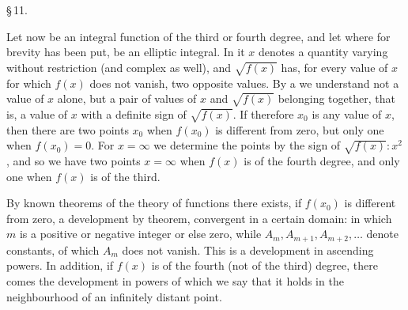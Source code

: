 \begin{center}
\S\,11. \textbf{}
\end{center}
Let now
be an integral function of the third or fourth degree, and let
where for brevity
has been put, be an elliptic integral. In it $x$ denotes a quantity varying without restriction (and complex as well), and $\sqrt{f(x)}$ has, for every value of $x$ for which $f(x)$ does not vanish, two opposite values. By a  we understand not a value of $x$ alone, but a pair of values of $x$ and $\sqrt{f(x)}$ belonging together, that is, a value of $x$ with a definite sign of $\sqrt{f(x)}$. If therefore $x_0$ is any value of $x$, then there are two points $x_0$ when $f(x_0)$ is different from zero, but only one when $f(x_0) = 0$. For $x = \infty$ we determine the points by the sign of $\sqrt{f(x)}:x^2$, and so we have two points $x = \infty$ when $f(x)$ is of the fourth degree, and only one when $f(x)$ is of the third.

By known theorems of the theory of functions there exists, if $f(x_0)$ is different from zero, a development by  theorem, convergent in a certain domain:
in which $m$ is a positive or negative integer or else zero, while $A_m, A_{m+1}, A_{m+2}, \dots$ denote constants, of which $A_m$ does not vanish. This is a development in ascending powers. In addition, if $f(x)$ is of the fourth (not of the third) degree, there comes the development in  powers
of which we say that it holds in the neighbourhood of an infinitely distant point.
